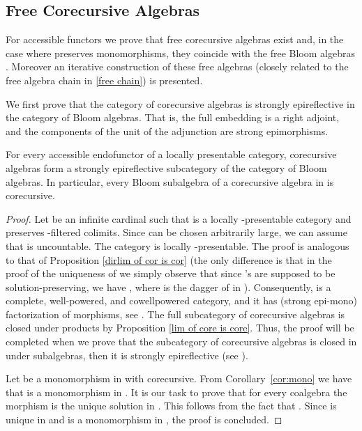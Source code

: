 \documentclass{LMCS}
\theoremstyle{plain}
\theoremstyle{definition}
\numberwithin{equation}{section}
\begin{document}
\begin{defi}
\section{Free Corecursive Algebras}
\label{sec:4}

For accessible functors  we prove that free corecursive algebras  exist and, in the case where  preserves monomorphisms, they coincide with the free Bloom algebras . Moreover an iterative construction of these free algebras (closely related to the free algebra chain in \ref{free chain}) is presented.

We first prove that the category of corecursive algebras is strongly epireflective in the category of Bloom algebras. That is, the full embedding is a right adjoint, and the components of the unit of the adjunction are strong epimorphisms.


\begin{prop}\label{cor reflected of B}
For every accessible endofunctor of  a locally presentable category, corecursive algebras form a strongly epireflective subcategory of the category of Bloom algebras. In particular, every Bloom subalgebra of a corecursive algebra in  is corecursive.
\end{prop}

\begin{proof}
Let  be an infinite cardinal such that  is a
locally -presentable category and  preserves
-filtered colimits. Since  can be chosen
arbitrarily large, we can assume that  is uncountable. The
category  is locally -presentable. The
proof is analogous to that of Proposition \ref{dirlim of cor is cor}
(the only difference is that in the proof of the uniqueness of
 we simply observe that since 's are supposed to be
solution-preserving, we have , where  is the
dagger of  in ). Consequently,  is a
complete, well-powered, and cowellpowered category, and it has (strong
epi-mono) factorization of morphisms, see \cite{ar}. The full
subcategory of corecursive algebras is closed under products by
Proposition \ref{lim of core is core}. Thus, the proof will be
completed when we prove that the subcategory of  corecursive algebras
is closed in  under subalgebras, then it is
strongly epireflective (see \cite[Theorem~16.8]{ahs}).

Let  be a monomorphism in
 with  corecursive. From Corollary~\ref{cor:mono} we have that  is a monomorphism in . It is our task to prove that for every coalgebra  the morphism  is the unique solution in . This follows from the fact that . Since  is unique in  and  is a monomorphism in , the proof is concluded.
\end{proof}


\end{defi}
\end{document}
